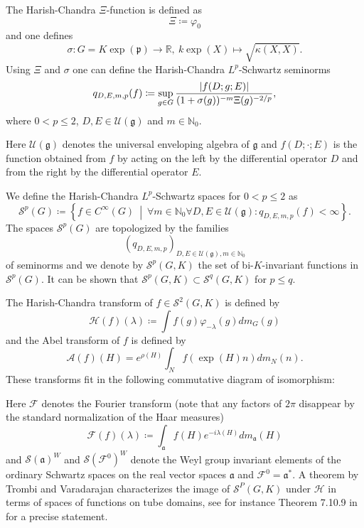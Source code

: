 \documentclass[12pt,reqno,a4paper]{amsart}
\theoremstyle{theorem}
\theoremstyle{definition}
\numberwithin{theorem}{section}
\numberwithin{equation}{section}
\newcommand{\R}{\mathbb{R}}
\newcommand{\N}{\mathbb{N}}
\newcommand{\setdiv}{\ \middle|\ }
\DeclarePairedDelimiter{\abs}{\lvert}{\rvert}
\begin{document}
The Harish-Chandra $\Xi$-function is defined as 
\[\Xi\coloneqq \varphi_0\]
and one defines 
\[\sigma:G=K\exp(\mathfrak{p})\to \R,\ k\exp(X)\mapsto \sqrt{\kappa(X,X)}.\]
Using $\Xi$ and $\sigma$ one can define the Harish-Chandra $L^p$-Schwartz seminorms
\[q_{D,E, m, p}(f)\coloneqq \sup_{g\in G} \frac{ \abs{f(D;g;E)}}{(1+\sigma(g))^{-m}\Xi(g)^{-2/p}},\] where $0< p\leq 2$, $D,E\in \mathcal{U(\mathfrak{g})}$ and $m\in \N_0$. 

Here $\mathcal{U}(\mathfrak{g})$ denotes the universal enveloping algebra of $\mathfrak{g}$ and $f(D;\cdot;E)$ is the function obtained from $f$ by acting on the left by the differential operator $D$ and from the right by the differential operator $E$.

We define the Harish-Chandra $L^p$-Schwartz spaces for $0<p\leq 2$ as
\[
\mathscr{S}^p(G)\coloneqq \left\{f\in C^\infty(G)\setdiv \forall m\in \N_0\forall D,E\in \mathcal{U}(\mathfrak{g}) : q_{D,E,m,p}(f)<\infty \right\}.
\]
The spaces $\mathscr{S}^p(G)$ are topologized by the families 
\[
(q_{D,E,m,p})_{D,E\in \mathcal{U(\mathfrak{g})},m\in \N_0}
\]
 of seminorms and we denote by $\mathscr{S}^p(G, K)$ the set of bi-$K$-invariant functions in $\mathscr{S}^p(G)$.
It can be shown that $\mathscr{S}^p(G,K)\subset \mathscr{S}^q(G, K)$ for $p\leq q$.

The Harish-Chandra transform of $f\in \mathscr{S}^2(G, K)$ is defined by
\[\mathcal{H}(f)(\lambda) \coloneqq \int f(g)\varphi_{-\lambda}(g)dm_G(g)\]
and the Abel transform of $f$ is defined by
\[\mathcal{A}(f)(H) = e^{\rho(H)}\int_Nf(\exp(H)n)dm_N(n).\]
These transforms fit in the following commutative diagram of isomorphism:
\begin{center}
\end{center}

Here $\mathcal{F}$ denotes the Fourier transform (note that any factors of $2\pi$ disappear by the standard normalization of the Haar measures)
\[\mathcal{F}(f)(\lambda)\coloneqq \int_\mathfrak{a} f(H)e^{-i\lambda(H)}dm_\mathfrak{a}(H)\]
and $\mathscr{S}(\mathfrak{a})^W$ and $\mathscr{S}(\mathscr{F}^0)^W$ denote the Weyl group invariant elements of the ordinary Schwartz spaces on the real vector spaces $\mathfrak{a}$ and $\mathscr{F}^0=\mathfrak{a}^*$.
A theorem by Trombi and Varadarajan characterizes the image of $\mathscr{S}^P(G, K)$ under $\mathcal{H}$  in terms of spaces of functions on tube domains, see for instance Theorem 7.10.9 in \cite{VaradarajanGangolli} for a precise statement.
\end{document}
